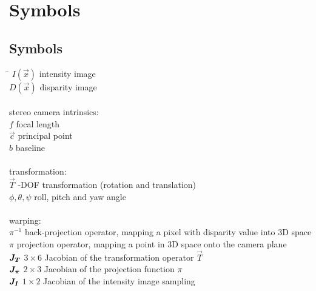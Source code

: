 \chapter*{Symbols}
\label{sec:symbols}

\section*{Symbols}

\begin{tabbing}
 \hspace*{1.6cm} \= \kill
 $I(\vec{x})$          \> intensity image \\[0.5ex]
 $D(\vec{x})$          \> disparity image \\[0.5ex]
 \\
 stereo camera intrinsics: \\
 $f$                            \> focal length \\[0.5ex]
 $\vec{c}$                      \> principal point \\[0.5ex]
 $b$                            \> baseline \\[0.5ex]
 \\
 transformation:\\
 $\vec{T}$                      -DOF transformation (rotation and translation) \\[0.5ex]
 $\phi, \theta, \psi$           \> roll, pitch and yaw angle \\[0.5ex]
 \\
 warping: \\
 $\pi^{-1}$                     \> back-projection operator, mapping a pixel with disparity value into 3D space \\[0.5ex]
 $\pi$                          \> projection operator, mapping a point in 3D space onto the camera plane \\[0.5ex]
 $\mat{J_T}$                    \> $3 \times 6$ Jacobian of the transformation operator $\vec{T}$ \\[0.5ex]
 $\mat{J_{\pi}}$                    \> $2 \times 3$ Jacobian of the projection function $\pi$ \\[0.5ex]
 $\mat{J_I}$                    \> $1 \times 2$ Jacobian of the intensity image sampling \\[0.5ex]
\end{tabbing}

